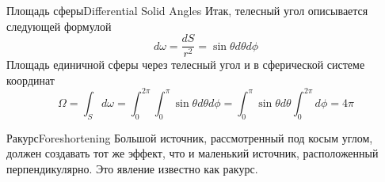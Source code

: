 \documentclass{beamer}
\begin{document}
	\begin{frame}{Площадь сферы}{Differential Solid Angles}
		Итак, телесный угол описывается следующей формулой
		\[
			d \omega = \frac{d S}{ r^2} =	\sin \theta  d \theta d \phi
		\]
		Площадь единичной сферы через телесный угол и в сферической системе координат
		\[
			\Omega = \int_{S} d \omega 
			= 
			\int_{0}^{2\pi}\int_{0}^{\pi} \sin \theta  d \theta d \phi
			= 
			\int_{0}^{\pi} \sin \theta d \theta \int_{0}^{2\pi} d \phi
			=
			4 \pi
		\]

	\end{frame}

	\begin{frame}{Ракурс}{Foreshortening}
		Большой источник, рассмотренный под косым углом, должен создавать тот же эффект, что и маленький источник, расположенный перпендикулярно. Это явление известно как ракурс.

	\end{frame}
	
\end{document}

